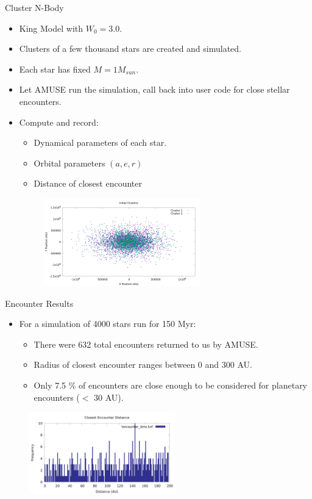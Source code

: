 \documentclass{beamer}
\begin{document}
\begin{frame}{Cluster N-Body}
    \begin{itemize}
        \item King Model with $W_0 = 3.0$.
        \item Clusters of a few thousand stars are created and simulated.
        \item Each star has fixed $M = 1 M_{sun}$.
        \item Let AMUSE run the simulation, call back into user code for close
            stellar encounters.
        \item Compute and record:
            \begin{itemize}
                \item Dynamical parameters of each star.
                \item Orbital parameters $(a, e, r)$
                \item Distance of closest encounter
            \end{itemize}
        \begin{figure}
            \centering
            \includegraphics[height=1.5in]{cluster_superimposed.png}
        \end{figure}
    \end{itemize}

\end{frame}

\begin{frame}{Encounter Results}
    \begin{itemize}
        \item For a simulation of 4000 stars run for 150 Myr:
            \begin{itemize}
                \item There were 632 total encounters returned to us by AMUSE.
                \item Radius of closest encounter ranges between 0 and 300 AU.
                \item Only 7.5 \% of encounters are close enough to be
                    considered for planetary encounters ($<$ 30 AU).
            \end{itemize}
    \end{itemize}
    \begin{figure}
        \center
        \includegraphics[width=2.5in]{encounter_dist}
    \end{figure}
\end{frame}
\end{document}
